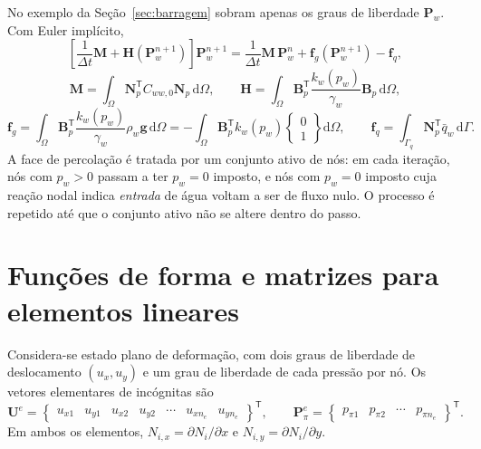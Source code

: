 \documentclass[11pt,a4paper]{article}
\newcommand{\dd}{\mathrm{d}}
\begin{document}
No exemplo da Seção~\ref{sec:barragem} sobram apenas os graus de liberdade $\mathbf P_w$.
Com Euler implícito,
\begin{equation*}
\boxed{\left[\frac{1}{\Delta t}\mathbf M+\mathbf H(\mathbf P_w^{n+1})\right]\mathbf P_w^{n+1}
=\frac{1}{\Delta t}\mathbf M\,\mathbf P_w^{n}+\mathbf f_g(\mathbf P_w^{n+1})-\mathbf f_q,}
\end{equation*}
\begin{equation*}
\mathbf M=\int_\Omega\mathbf N_p^{\mathsf T}C_{ww,0}\mathbf N_p\,\dd\Omega,\qquad
\mathbf H=\int_\Omega\mathbf B_p^{\mathsf T}\frac{k_w(p_w)}{\gamma_w}\mathbf B_p\,\dd\Omega,
\end{equation*}
\begin{equation*}
\mathbf f_g=\int_\Omega\mathbf B_p^{\mathsf T}\frac{k_w(p_w)}{\gamma_w}\rho_w\mathbf g\,\dd\Omega
=-\int_\Omega\mathbf B_p^{\mathsf T}k_w(p_w)\begin{Bmatrix}0\\1\end{Bmatrix}\dd\Omega,
\qquad
\mathbf f_q=\int_{\Gamma_q}\mathbf N_p^{\mathsf T}\bar q_w\,\dd\Gamma .
\end{equation*}
A face de percolação é tratada por um conjunto ativo de nós: em cada
iteração, nós com $p_w>0$ passam a ter $p_w=0$ imposto, e nós com
$p_w=0$ imposto cuja reação nodal indica \emph{entrada} de água voltam a
ser de fluxo nulo. O processo é repetido até que o conjunto ativo não se
altere dentro do passo.

\section{Funções de forma e matrizes para elementos lineares}
\label{sec:matrizes}

Considera-se estado plano de deformação, com dois graus de liberdade de
deslocamento $(u_x,u_y)$ e um grau de liberdade de cada pressão por nó.
Os vetores elementares de incógnitas são
\begin{equation*}
\mathbf U^e=\begin{Bmatrix}u_{x1}&u_{y1}&u_{x2}&u_{y2}&\cdots&u_{xn_e}&u_{yn_e}\end{Bmatrix}^{\mathsf T},
\qquad
\mathbf P_\pi^e=\begin{Bmatrix}p_{\pi1}&p_{\pi2}&\cdots&p_{\pi n_e}\end{Bmatrix}^{\mathsf T}.
\end{equation*}
Em ambos os elementos, $N_{i,x}=\partial N_i/\partial x$ e
$N_{i,y}=\partial N_i/\partial y$.
\end{document}
